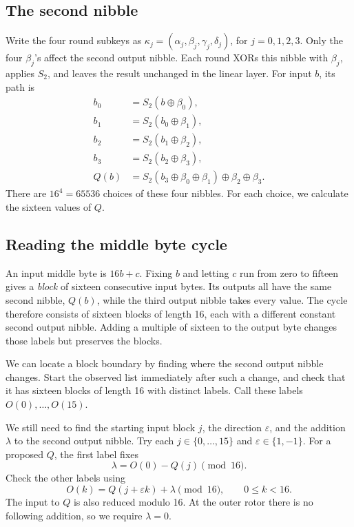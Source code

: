 \documentclass[11pt]{article}
\newcommand{\xor}{\mathbin\oplus}
\begin{document}
\subsection{The second nibble}
Write the four round subkeys as
\(\kappa_j=(\alpha_j,\beta_j,\gamma_j,\delta_j)\), for \(j=0,1,2,3\).
Only the four \(\beta_j\)'s affect the second output nibble. Each round
XORs this nibble with \(\beta_j\), applies \(S_2\), and leaves the result
unchanged in the linear layer. For input \(b\), its path is
\begin{align*}
 b_0&=S_2(b\xor\beta_0),\\
 b_1&=S_2(b_0\xor\beta_1),\\
 b_2&=S_2(b_1\xor\beta_2),\\
 b_3&=S_2(b_2\xor\beta_3),\\
 Q(b)&=S_2(b_3\xor\beta_0\xor\beta_1)\xor\beta_2\xor\beta_3.
\end{align*}
There are \(16^4=65536\) choices of these four nibbles. For each choice,
we calculate the sixteen values of \(Q\).

\subsection{Reading the middle byte cycle}\label{sec:middlecycle}
An input middle byte is \(16b+c\). Fixing \(b\) and letting \(c\)
run from zero to fifteen gives a \emph{block} of sixteen consecutive
input bytes. Its outputs all have the same second nibble, \(Q(b)\),
while the third output nibble takes every value. The cycle therefore
consists of sixteen blocks of length 16, each with a different constant
second output nibble. Adding a multiple of sixteen to the output byte
changes those labels but preserves the blocks.

We can locate a block boundary by finding where the second output
nibble changes. Start the observed list immediately after such a
change, and check that it has sixteen blocks of length 16 with distinct
labels. Call these labels \(O(0),\ldots,O(15)\).

We still need to find the starting input block \(j\), the direction
\(\varepsilon\), and the addition \(\lambda\) to the second output
nibble. Try each \(j\in\{0,\ldots,15\}\) and
\(\varepsilon\in\{1,-1\}\). For a proposed \(Q\), the first label fixes
\[
 \lambda=O(0)-Q(j)\pmod {16}.
\]
Check the other labels using
\begin{equation}
 O(k)=Q(j+\varepsilon k)+\lambda\pmod {16},
 \qquad 0\le k<16.
 \label{eq:smallguess}
\end{equation}
The input to \(Q\) is also reduced modulo 16. At the outer rotor there
is no following addition, so we require \(\lambda=0\).
\end{document}
